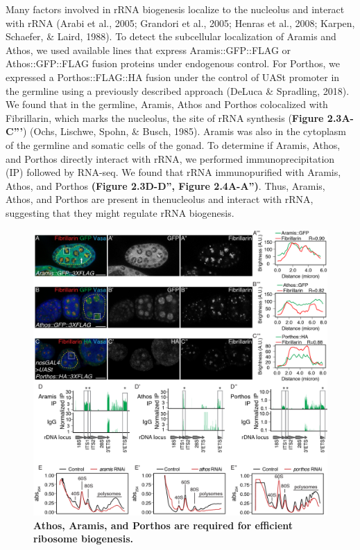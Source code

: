 \documentclass[12pt,oneside]{reedthesis}
\begin{document}
Many factors involved in rRNA biogenesis localize to the nucleolus and interact with rRNA (Arabi et al., 2005; Grandori et al., 2005; Henras et al., 2008; Karpen, Schaefer, \& Laird, 1988). To detect the subcellular localization of Aramis and Athos, we used available lines that express Aramis::GFP::FLAG or Athos::GFP::FLAG fusion proteins under endogenous control. For Porthos, we expressed a Porthos::FLAG::HA fusion under the control of UASt promoter in the germline using a previously described approach (DeLuca \& Spradling, 2018). We found that in the germline, Aramis, Athos and Porthos colocalized with Fibrillarin, which marks the nucleolus, the site of rRNA synthesis (\textbf{Figure 2.3A-C'''}) (Ochs, Lischwe, Spohn, \& Busch, 1985). Aramis was also in the cytoplasm of the germline and somatic cells of the gonad. To determine if Aramis, Athos, and Porthos directly interact with rRNA, we performed immunoprecipitation (IP) followed by RNA-seq. We found that rRNA immunopurified with Aramis, Athos, and Porthos \textbf{(Figure 2.3D-D'', Figure 2.4A-A'')}. Thus, Aramis, Athos, and Porthos are present in thenucleolus and interact with rRNA, suggesting that they might regulate rRNA biogenesis.
\begin{figure}

{\centering \includegraphics[width=1\linewidth]{./figure/Ribosome Biogenesis/Ribosome Biogenesis 2} 

}

\caption[\textbf{Athos, Aramis, and Porthos are required for efficient ribosome biogenesis.}]{\textbf{Athos, Aramis, and Porthos are required for efficient ribosome biogenesis.}}\label{fig:unnamed-chunk-10}
\end{figure}
\end{document}
